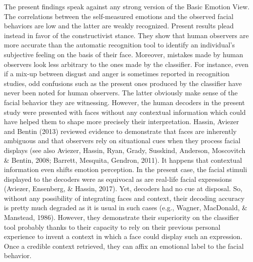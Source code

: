 \documentclass[man]{apa6}
\begin{document}
The present findings speak against any strong version of the Basic Emotion View. The correlations between the self-measured emotions and the observed facial behaviors are low and the latter are weakly recognized. Present results plead instead in favor of the constructivist stance. They show that human observers are more accurate than the automatic recognition tool to identify an individual's subjective feeling on the basis of their face. Moreover, mistakes made by human observers look less arbitrary to the ones made by the classifier. For instance, even if a mix-up between disgust and anger is sometimes reported in recognition studies, odd confusions such as the present ones produced by the classifier have never been noted for human observers. The latter obviously make sense of the facial behavior they are witnessing. However, the human decoders in the present study were presented with faces without any contextual information which could have helped them to shape more precisely their interpretation. Hassin, Aviezer and Bentin (2013) reviewed evidence to demonstrate that faces are inherently ambiguous and that observers rely on situational cues when they process facial displays (see also Aviezer, Hassin, Ryan, Grady, Susskind, Anderson, Moscovitch \& Bentin, 2008; Barrett, Mesquita, Gendron, 2011). It happens that contextual information even shifts emotion perception. In the present case, the facial stimuli displayed to the decoders were as equivocal as are real-life facial expressions (Aviezer, Ensenberg, \& Hassin, 2017). Yet, decoders had no cue at disposal. So, without any possibility of integrating faces and context, their decoding accuracy is pretty much degraded as it is usual in such cases (e.g., Wagner, MacDonald, \& Manstead, 1986). However, they demonstrate their superiority on the classifier tool probably thanks to their capacity to rely on their previous personal experience to invent a context in which a face could display such an expression. Once a credible context retrieved, they can affix an emotional label to the facial behavior.
\end{document}
